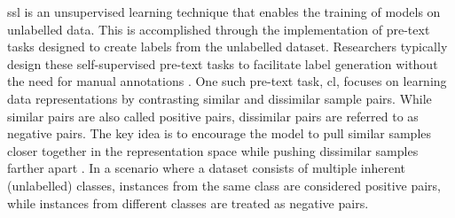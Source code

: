 \acf{ssl} is an unsupervised learning technique that enables the training of models on unlabelled data.
This is accomplished through the implementation of pre-text tasks 
designed to create labels from the unlabelled dataset.
Researchers typically design these self-supervised pre-text tasks 
to facilitate label generation without the need for manual annotations \citet{PIC_2020}.
One such pre-text task, \acf{cl}, 
focuses on learning data representations by contrasting similar and dissimilar sample pairs. 
While similar pairs are also called positive pairs, 
dissimilar pairs are referred to as negative pairs.
The key idea is to encourage the model to pull similar samples closer together in the representation space 
while pushing dissimilar samples farther apart \citet{mining_potential_2024}.
In a scenario where a dataset consists of multiple inherent (unlabelled) classes, 
instances from the same class are considered positive pairs, 
while instances from different classes are treated as negative pairs.